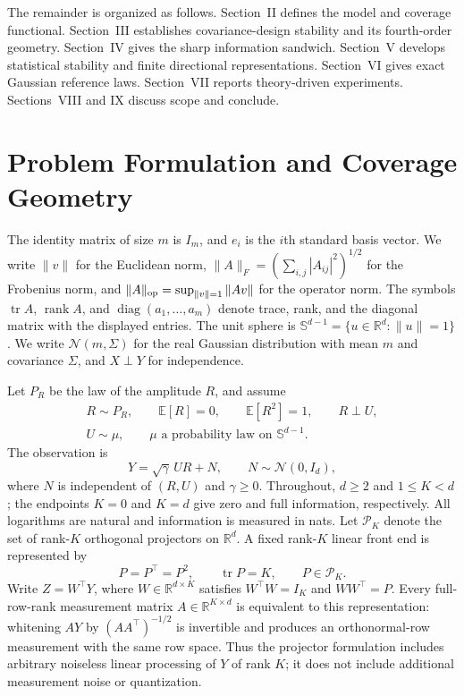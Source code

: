 \documentclass[lettersize,onecolumn]{IEEEtran}
\theoremstyle{remark}
\theoremstyle{definition}
\newcommand{\R}{\mathbb R}
\newcommand{\EE}{\mathbb E}
\newcommand{\tr}{\operatorname{tr}}
\newcommand{\rank}{\operatorname{rank}}
\newcommand{\Pset}{\mathcal P_K}
\begin{document}
The remainder is organized as follows. Section~II defines the model and coverage functional. Section~III establishes covariance-design stability and its fourth-order geometry. Section~IV gives the sharp information sandwich. Section~V develops statistical stability and finite directional representations. Section~VI gives exact Gaussian reference laws. Section~VII reports theory-driven experiments. Sections~VIII and IX discuss scope and conclude.

\section{Problem Formulation and Coverage Geometry}

The identity matrix of size $m$ is $I_m$, and $e_i$ is the $i$th standard basis vector. We write $\|v\|$ for the Euclidean norm, $\|A\|_F=(\sum_{i,j}|A_{ij}|^2)^{1/2}$ for the Frobenius norm, and $\|A\|_{\rm op}=\sup_{\|v\|=1}\|Av\|$ for the operator norm. The symbols $\tr A$, $\rank A$, and $\operatorname{diag}(a_1,\ldots,a_m)$ denote trace, rank, and the diagonal matrix with the displayed entries. The unit sphere is $\mathbb S^{d-1}=\{u\in\R^d:\|u\|=1\}$. We write $\mathcal N(m,\Sigma)$ for the real Gaussian distribution with mean $m$ and covariance $\Sigma$, and $X\perp Y$ for independence.

Let $P_R$ be the law of the amplitude $R$, and assume
\begin{equation}
\begin{gathered}
R\sim P_R, \qquad \EE[R]=0, \qquad \EE[R^2]=1,\qquad R\perp U,\\
U\sim\mu,\qquad \mu\text{ a probability law on }\mathbb S^{d-1}.
\end{gathered}
\label{eq:model}
\end{equation}
The observation is
\begin{equation}
Y=\sqrt{\gamma}\,UR+N,
\qquad N\sim\mathcal N(0,I_d),
\end{equation}
where $N$ is independent of $(R,U)$ and $\gamma\ge0$. Throughout, $d\ge2$ and $1\le K<d$; the endpoints $K=0$ and $K=d$ give zero and full information, respectively. All logarithms are natural and information is measured in nats. Let $\Pset$ denote the set of rank-$K$ orthogonal projectors on $\R^d$. A fixed rank-$K$ linear front end is represented by
\begin{equation}
P=P^{\top}=P^2, \qquad \tr P=K,
\qquad P\in\Pset.
\end{equation}
Write $Z=W^{\top}Y$, where $W\in\R^{d\times K}$ satisfies $W^{\top}W=I_K$ and $WW^{\top}=P$. Every full-row-rank measurement matrix $A\in\R^{K\times d}$ is equivalent to this representation: whitening $AY$ by $(AA^{\top})^{-1/2}$ is invertible and produces an orthonormal-row measurement with the same row space. Thus the projector formulation includes arbitrary noiseless linear processing of $Y$ of rank $K$; it does not include additional measurement noise or quantization.
\end{document}
